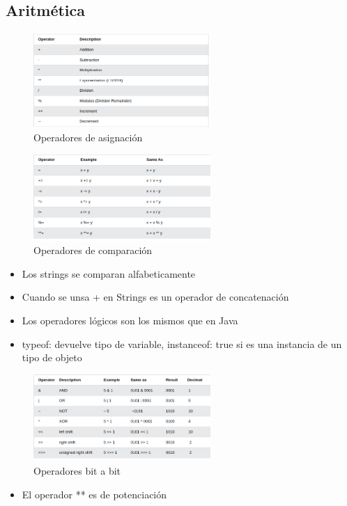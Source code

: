 \documentclass{article}
\begin{document}
 \subsection{Aritmética}

 \begin{figure}[H]
   \centering
   \includegraphics[width=0.6\textwidth]{img/table2.png}
   \caption{Operadores de asignación}
 \end{figure}

 \begin{figure}[H]
   \centering
   \includegraphics[width=0.6\textwidth]{img/table3.png}
   \caption{Operadores de comparación}
 \end{figure}

 \begin{itemize}
   \item Los strings se comparan alfabeticamente
   \item Cuando se unsa + en Strings es un operador de concatenación
   \item Los operadores lógicos son los mismos que en Java
   \item typeof: devuelve tipo de variable, instanceof: true si es una instancia de un tipo de objeto
 \end{itemize}
 \begin{figure}
   \centering
   \includegraphics[width=0.6\textwidth]{img/table4.png}
   \caption{Operadores bit a bit}
 \end{figure}
 \begin{itemize}
   \item El operador ** es de potenciación
 \end{itemize}
\end{document}
